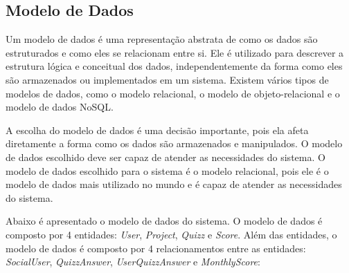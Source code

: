 \subsection{Modelo de Dados}

Um modelo de dados é uma representação abstrata de como os dados são estruturados e como eles se relacionam entre si. Ele é utilizado para descrever a estrutura lógica e conceitual dos dados, independentemente da forma como eles são armazenados ou implementados em um sistema. Existem vários tipos de modelos de dados, como o modelo relacional, o modelo de objeto-relacional e o modelo de dados NoSQL.

A escolha do modelo de dados é uma decisão importante, pois ela afeta diretamente a forma como os dados são armazenados e manipulados. O modelo de dados escolhido deve ser capaz de atender as necessidades do sistema. O modelo de dados escolhido para o sistema é o modelo relacional, pois ele é o modelo de dados mais utilizado no mundo e é capaz de atender as necessidades do sistema.

Abaixo é apresentado o modelo de dados do sistema. O modelo de dados é composto por 4 entidades: \textit{User}, \textit{Project}, \textit{Quizz} e \textit{Score}. Além das entidades, o modelo de dados é composto por 4 relacionamentos entre as entidades: \textit{SocialUser}, \textit{QuizzAnswer}, \textit{UserQuizzAnswer} e \textit{MonthlyScore}:

